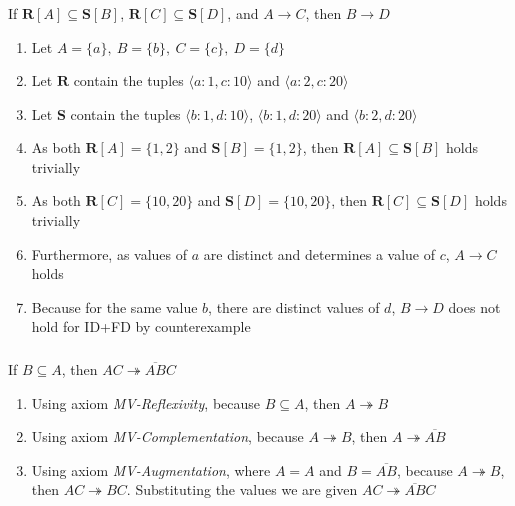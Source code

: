 \documentclass[letterpaper]{article}
\theoremstyle{plain}
\theoremstyle{definition}
\theoremstyle{remark}
\begin{document}
\subsubsection{}
\begin{center}
    If $\textbf{R}[A]\subseteq\textbf{S}[B]$, $\textbf{R}[C]\subseteq\textbf{S}[D]$, and $A\rightarrow C$, then $B\rightarrow D$
\end{center}
\begin{enumerate}
    \item Let $A=\{a\},~B=\{b\},~C=\{c\},~D=\{d\}$
    \item Let $\textbf{R}$ contain the tuples $\langle a:1,c:10 \rangle$ and $\langle a:2,c:20 \rangle$
    \item Let $\textbf{S}$ contain the tuples $\langle b:1,d:10 \rangle$, $\langle b:1,d:20 \rangle$ and $\langle b:2,d:20 \rangle$
    \item As both $\textbf{R}[A]=\{1,2\}$ and $\textbf{S}[B]=\{1,2\}$, then $\textbf{R}[A]\subseteq\textbf{S}[B]$ holds trivially
    \item As both $\textbf{R}[C]=\{10,20\}$ and $\textbf{S}[D]=\{10,20\}$, then $\textbf{R}[C]\subseteq\textbf{S}[D]$ holds trivially
    \item Furthermore, as values of $a$ are distinct and determines a value of $c$, $A\rightarrow C$ holds
    \item Because for the same value $b$, there are distinct values of $d$, $B\rightarrow D$ does not hold for ID+FD by counterexample
\end{enumerate}
\subsubsection{}
\begin{center}
    If $B\subseteq A$, then $AC\twoheadrightarrow \overline{AB}C$
\end{center}
\begin{enumerate}
    \item Using axiom \textit{MV-Reflexivity}, because $B\subseteq A$, then $A\twoheadrightarrow B$
    \item Using axiom \textit{MV-Complementation}, because $A\twoheadrightarrow B$, then $A\twoheadrightarrow \overline{AB}$
    \item Using axiom \textit{MV-Augmentation}, where $A=A$ and $B=\overline{AB}$, because $A\twoheadrightarrow B$, then $AC\twoheadrightarrow BC$. Substituting the values we are given $AC\twoheadrightarrow \overline{AB}C$
\end{enumerate}
\end{document}
